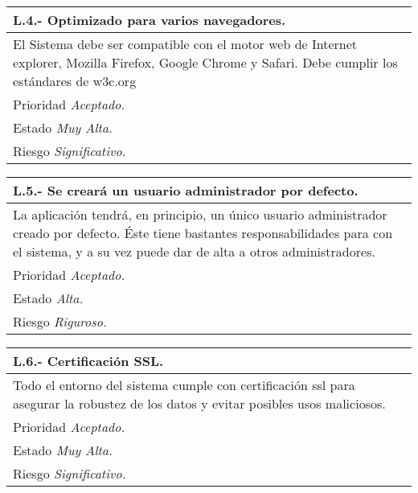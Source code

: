 \documentclass[a4paper,oneside,11pt]{book}
\begin{document}
\begin{center}
\begin{tabulary}{15cm}{|L|}
	\hline
		\bf{L.4.- Optimizado para varios navegadores.} \\
	\hline
		El Sistema debe ser compatible con el motor web de Internet explorer, Mozilla Firefox, Google Chrome y Safari. Debe cumplir los estándares de w3c.org\\
	\hline
		Prioridad \textit{Aceptado.} \\
	\hline
		Estado \textit{Muy Alta.} \\
	\hline
		Riesgo \textit{Significativo.} \\
	\hline
\end{tabulary}
\end{center}

\begin{center}
\begin{tabulary}{15cm}{|L|}
	\hline
		\bf{L.5.- Se creará un usuario administrador por defecto.} \\
	\hline
		La aplicación tendrá, en principio, un único usuario administrador creado por defecto. Éste tiene bastantes responsabilidades para con el sistema, y a su vez puede dar de alta a otros administradores. \\
	\hline
		Prioridad \textit{Aceptado.} \\
	\hline
		Estado \textit{Alta.} \\
	\hline
		Riesgo \textit{Riguroso.} \\
	\hline
\end{tabulary}
\end{center}

\begin{center}
\begin{tabulary}{15cm}{|L|}
	\hline
		\bf{L.6.- Certificación SSL.} \\
	\hline
		Todo el entorno del sistema cumple con certificación ssl para asegurar la robustez de los datos y evitar posibles usos maliciosos. \\
	\hline
		Prioridad \textit{Aceptado.} \\
	\hline
		Estado \textit{Muy Alta.} \\
	\hline
		Riesgo \textit{Significativo.} \\
	\hline
\end{tabulary}
\end{center}
\end{document}
